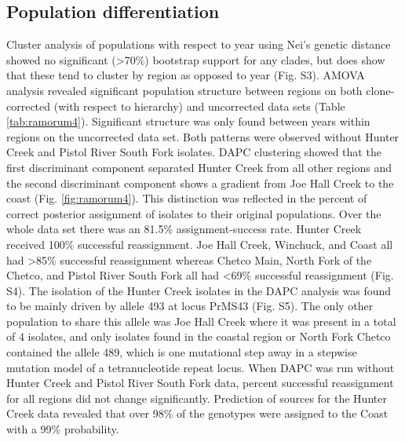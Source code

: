 \documentclass[double,12pt]{beavtex}
\begin{document}
  \subsection{Population
  differentiation}\label{population-differentiation}
  
  Cluster analysis of populations with respect to year using Nei's genetic
  distance showed no significant (\textgreater{}70\%) bootstrap support
  for any clades, but does show that these tend to cluster by region as
  opposed to year (Fig. S3). AMOVA analysis revealed significant
  population structure between regions on both clone-corrected (with
  respect to hierarchy) and uncorrected data sets (Table
  \ref{tab:ramorum4}). Significant structure was only found between years
  within regions on the uncorrected data set. Both patterns were observed
  without Hunter Creek and Pistol River South Fork isolates. DAPC
  clustering showed that the first discriminant component separated Hunter
  Creek from all other regions and the second discriminant component shows
  a gradient from Joe Hall Creek to the coast (Fig. \ref{fig:ramorum4}).
  This distinction was reflected in the percent of correct posterior
  assignment of isolates to their original populations. Over the whole
  data set there was an 81.5\% assignment-success rate. Hunter Creek
  received 100\% successful reassignment. Joe Hall Creek, Winchuck, and
  Coast all had \textgreater{}85\% successful reassignment whereas Chetco
  Main, North Fork of the Chetco, and Pistol River South Fork all had
  \textless{}69\% successful reassignment (Fig. S4). The isolation of the
  Hunter Creek isolates in the DAPC analysis was found to be mainly driven
  by allele 493 at locus PrMS43 (Fig. S5). The only other population to
  share this allele was Joe Hall Creek where it was present in a total of
  4 isolates, and only isolates found in the coastal region or North Fork
  Chetco contained the allele 489, which is one mutational step away in a
  stepwise mutation model of a tetranucleotide repeat locus. When DAPC was
  run without Hunter Creek and Pistol River South Fork data, percent
  successful reassignment for all regions did not change significantly.
  Prediction of sources for the Hunter Creek data revealed that over 98\%
  of the genotypes were assigned to the Coast with a 99\% probability.
  
\end{document}
